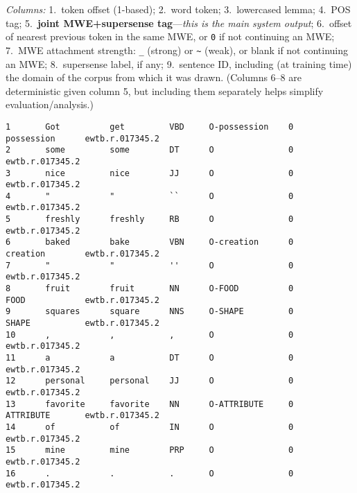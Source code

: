 \documentclass[11pt]{article}
\newcommand{\tat}[0]{\textasciitilde}
\begin{document}
\begin{figure*}\small
\emph{Columns:} 1.~token offset (1-based); 2.~word token; 3.~lowercased lemma; 
4.~POS tag; 5.~\textbf{joint MWE+supersense tag}---\emph{this is the main system output}; 6.~offset of nearest previous token 
in the same MWE, or \texttt{0} if not continuing an MWE; 7.~MWE attachment strength: \texttt{\_} (strong) or \texttt{\tat} (weak), 
or blank if not continuing an MWE;
8.~supersense label, if any; 9.~sentence ID, including (at training time) the domain of the corpus from which it was drawn.
(Columns 6--8 are deterministic given column 5, 
but including them separately helps simplify evaluation\slash analysis.)
\begin{verbatim}
1       Got          get         VBD     O-possession    0               possession      ewtb.r.017345.2
2       some         some        DT      O               0                               ewtb.r.017345.2
3       nice         nice        JJ      O               0                               ewtb.r.017345.2
4       "            "           ``      O               0                               ewtb.r.017345.2
5       freshly      freshly     RB      O               0                               ewtb.r.017345.2
6       baked        bake        VBN     O-creation      0               creation        ewtb.r.017345.2
7       "            "           ''      O               0                               ewtb.r.017345.2
8       fruit        fruit       NN      O-FOOD          0               FOOD            ewtb.r.017345.2
9       squares      square      NNS     O-SHAPE         0               SHAPE           ewtb.r.017345.2
10      ,            ,           ,       O               0                               ewtb.r.017345.2
11      a            a           DT      O               0                               ewtb.r.017345.2
12      personal     personal    JJ      O               0                               ewtb.r.017345.2
13      favorite     favorite    NN      O-ATTRIBUTE     0               ATTRIBUTE       ewtb.r.017345.2
14      of           of          IN      O               0                               ewtb.r.017345.2
15      mine         mine        PRP     O               0                               ewtb.r.017345.2
16      .            .           .       O               0                               ewtb.r.017345.2


\end{verbatim}
\end{figure*}
\end{document}
